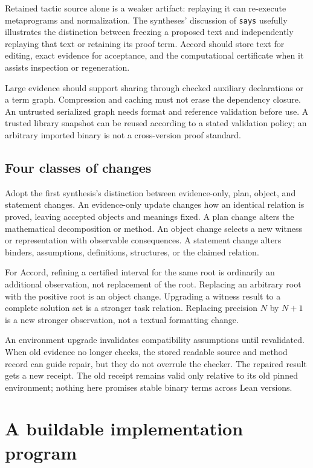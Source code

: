 \documentclass[11pt,letterpaper]{article}
\newcommand{\code}[1]{\nolinkurl{#1}}
\theoremstyle{definition}
\begin{document}
Retained tactic source alone is a weaker artifact: replaying it can re-execute
metaprograms and normalization. The syntheses' discussion of \code{says} usefully
illustrates the distinction between freezing a proposed text and independently
replaying that text or retaining its proof term\cite{synthesis,review}. Accord
should store text for editing, exact evidence for acceptance, and the computational
certificate when it assists inspection or regeneration.

Large evidence should support sharing through checked auxiliary declarations or
a term graph. Compression and caching must not erase the dependency closure.
An untrusted serialized graph needs format and reference validation before use.
A trusted library snapshot can be reused according to a stated validation policy;
an arbitrary imported binary is not a cross-version proof standard.

\subsection{Four classes of changes}
Adopt the first synthesis's distinction between evidence-only, plan, object, and
statement changes\cite{synthesis}. An evidence-only update changes how an identical
relation is proved, leaving accepted objects and meanings fixed. A plan change
alters the mathematical decomposition or method. An object change selects a
new witness or representation with observable consequences. A statement change
alters binders, assumptions, definitions, structures, or the claimed relation.

For Accord, refining a certified interval for the same root is ordinarily an
additional observation, not replacement of the root. Replacing an arbitrary root
with the positive root is an object change. Upgrading a witness result to a
complete solution set is a stronger task relation. Replacing precision \(N\) by
\(N+1\) is a new stronger observation, not a textual formatting change.

An environment upgrade invalidates compatibility assumptions until revalidated.
When old evidence no longer checks, the stored readable source and method record
can guide repair, but they do not overrule the checker. The repaired result gets a
new receipt. The old receipt remains valid only relative to its old pinned
environment; nothing here promises stable binary terms across Lean versions.

\section{A buildable implementation program}\label{sec:implementation}
\end{document}
